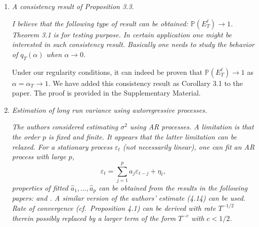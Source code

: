 \documentclass[a4paper,12pt]{article}
\begin{document}
\begin{enumerate}[label=(\arabic*),leftmargin=0.7cm]

\item \textit{A consistency result of Proposition 3.3.}

\textit{I believe that the following type of result can be obtained: $\mathbb{P} (E^{\ell}_T) \to 1$. Theorem 3.1 is for testing purpose. In certain application one might be interested in such consistency result. Basically one needs to study the behavior of $q_T(\alpha)$ when $\alpha \to 0$.}

Under our regularity conditions, it can indeed be proven that $\mathbb{P} (E^{\ell}_T) \to 1$ as $\alpha=\alpha_T \rightarrow 1$. We have added this consistency result as Corollary 3.1 to the paper. The proof is provided in the Supplementary Material.


\item \textit{Estimation of long run variance using autoregressive processes.}

\textit{The authors considered estimating $\sigma^2$ using AR processes. A limitation is that the order $p$ is fixed and finite. It appears that the latter limitation can be relaxed. For a stationary process $\varepsilon_t$ (not necessarily linear), one can fit an AR process with large $p$,}
\[ \varepsilon_t = \sum_{j=1}^p a_j \varepsilon_{t-j} + \eta_t, \]
\textit{properties of fitted $\widehat{a}_1, \ldots, \widehat{a}_p$ can be obtained from the results in the following papers: \cite{WuPourahmadi2009} and \cite{XiaoWu2012}.
A similar version of the authors' estimate (4.14) can be used. Rate of convergence (cf.\ Proposition 4.1) can be derived with rate $T^{-1/2}$ therein possibly replaced by a larger term of the form $T^{-c}$ with $c < 1/2$.}


\end{enumerate}
\end{document}
